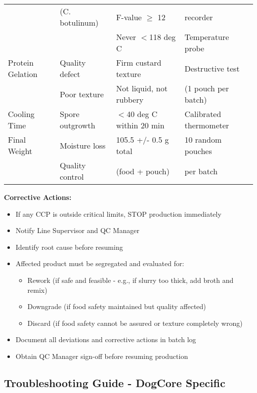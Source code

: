 \begin{table}[h]
\begin{tabular}{@{}llll@{}}
 & (C. botulinum) & F-value $\ge$ 12 & recorder \\
 & & Never $<$118 deg C & Temperature probe \\
\midrule
Protein Gelation & Quality defect & Firm custard texture & Destructive test \\
 & Poor texture & Not liquid, not rubbery & (1 pouch per batch) \\
\midrule
Cooling Time & Spore outgrowth & $<$40 deg C within 20 min & Calibrated thermometer \\
\midrule
Final Weight & Moisture loss & 105.5 +/- 0.5 g total & 10 random pouches \\
 & Quality control & (food + pouch) & per batch \\
\bottomrule
\end{tabular}
\end{table}

\vspace{1em}
\noindent\textbf{Corrective Actions:}
\begin{itemize}
\item If any CCP is outside critical limits, STOP production immediately
\item Notify Line Supervisor and QC Manager
\item Identify root cause before resuming
\item Affected product must be segregated and evaluated for:
  \begin{itemize}
  \item Rework (if safe and feasible - e.g., if slurry too thick, add broth and remix)
  \item Downgrade (if food safety maintained but quality affected)
  \item Discard (if food safety cannot be assured or texture completely wrong)
  \end{itemize}
\item Document all deviations and corrective actions in batch log
\item Obtain QC Manager sign-off before resuming production
\end{itemize}


\subsection*{Troubleshooting Guide - DogCore Specific}

